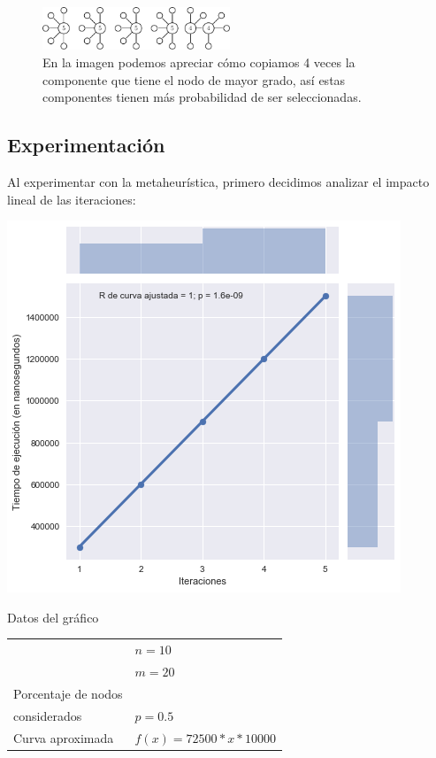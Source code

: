 \begin{figure}
\caption{En la imagen podemos apreciar cómo copiamos 4 veces la componente que tiene el nodo de mayor grado, así estas componentes tienen más probabilidad de ser seleccionadas.}
\includegraphics[width=0.5\textwidth]{img/patologicGrasp.pdf}
\end{figure}

\subsection{Experimentación}

Al experimentar con la metaheurística, primero decidimos analizar el impacto lineal de las iteraciones:

\noindent
\begin{minipage}{0.55\textwidth}
    \hfill
    \includegraphics[scale=0.6]{img/grasp-it.png}
\end{minipage}
\hfill
\begin{minipage}{0.44\textwidth}
    \begin{center}
        Datos del gráfico

        \begin{tabular}{ | l l |}
            \hline
             & $n = 10$ \\ 
             & $m = 20$ \\ 
            Porcentaje de nodos & \\
            considerados & $p = 0.5$ \\ 
            Curva aproximada & $f(x) = 72500 * x * 10000$ \\
            \hline
        \end{tabular}
    \end{center}
\end{minipage}

